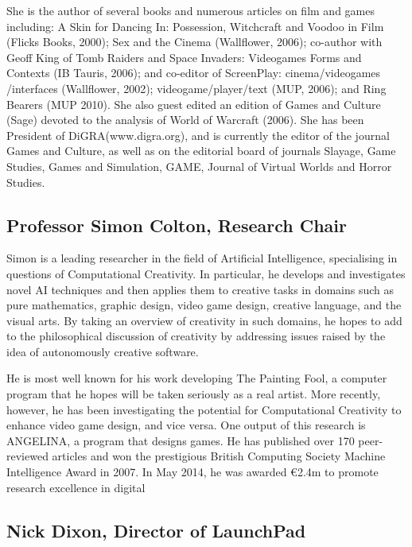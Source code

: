 She is the author of several books and numerous articles on film and games including: A Skin for Dancing In: Possession, Witchcraft and Voodoo in Film (Flicks Books, 2000); Sex and the Cinema (Wallflower, 2006); co-author with Geoff King of Tomb Raiders and Space Invaders: Videogames Forms and Contexts (IB Tauris, 2006); and co-editor of ScreenPlay: cinema/videogames /interfaces (Wallflower, 2002); videogame/player/text (MUP, 2006); and Ring Bearers (MUP 2010). She also guest edited an edition of Games and Culture (Sage) devoted to the analysis of World of Warcraft (2006). She has been President of DiGRA(www.digra.org), and is currently the editor of the journal Games and Culture, as well as on the editorial board of journals Slayage, Game Studies, Games and Simulation, GAME, Journal of Virtual Worlds and Horror Studies. \\

\subsection[Simon Colton]{Professor Simon Colton,  Research Chair}

Simon is a leading researcher in the field of Artificial Intelligence, specialising in questions of Computational Creativity. In particular, he develops and investigates novel AI techniques and then applies them to creative tasks in domains such as pure mathematics, graphic design, video game design, creative language, and the visual arts. By taking an overview of creativity in such domains, he hopes to add to the philosophical discussion of creativity by addressing issues raised by the idea of autonomously creative software. 

He is most well known for his work developing The Painting Fool, a computer program that he hopes will be taken seriously as a real artist. More recently, however, he has been investigating the potential for Computational Creativity to enhance video game design, and vice versa. One output of this research is ANGELINA, a program that designs games. He has published over 170 peer-reviewed articles and won the prestigious British Computing Society Machine Intelligence Award in 2007. In May 2014, he was awarded €2.4m to promote research excellence in digital 

\subsection[Nick Dixon]{Nick Dixon, Director of LaunchPad}

